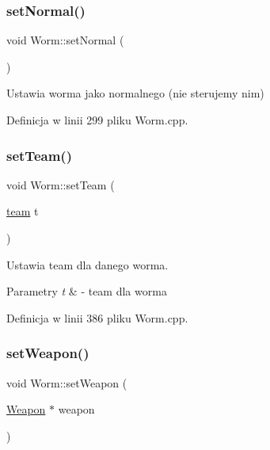 \subsubsection{\texorpdfstring{set\+Normal()}{setNormal()}}
{\footnotesize\ttfamily void Worm\+::set\+Normal (\begin{DoxyParamCaption}{ }\end{DoxyParamCaption})}



Ustawia worma jako normalnego (nie sterujemy nim) 



Definicja w linii 299 pliku Worm.\+cpp.

\mbox{\label{class_worm_a8eb6b3e55c2e6cb7c87b1593f34dac52}} 
\subsubsection{\texorpdfstring{set\+Team()}{setTeam()}}
{\footnotesize\ttfamily void Worm\+::set\+Team (\begin{DoxyParamCaption}\item[{\mbox{\hyperlink{_worm_8h_ae79581ee1998185d7cb41ab84352b97e}{team}}}]{t }\end{DoxyParamCaption})}



Ustawia team dla danego worma. 


\begin{DoxyParams}{Parametry}
{\em t} & -\/ team dla worma \\
\hline
\end{DoxyParams}


Definicja w linii 386 pliku Worm.\+cpp.

\mbox{\label{class_worm_a9f2a337a176e5186c7227880337c98c3}} 
\subsubsection{\texorpdfstring{set\+Weapon()}{setWeapon()}}
{\footnotesize\ttfamily void Worm\+::set\+Weapon (\begin{DoxyParamCaption}\item[{\mbox{\hyperlink{class_weapon}{Weapon}} $\ast$}]{weapon }\end{DoxyParamCaption})}



